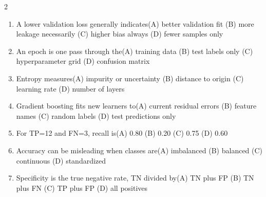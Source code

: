 \documentclass[a4paper]{article}
\begin{document}
\begin{multicols*}{2}
\begin{enumerate}[resume]
\item A lower validation loss generally indicates\newline\hspace*{0.6em}(A) better validation fit \quad (B) more leakage necessarily \newline\hspace*{0.6em}(C) higher bias always \quad (D) fewer samples only
\item An epoch is one pass through the\newline\hspace*{0.6em}(A) training data \quad (B) test labels only \newline\hspace*{0.6em}(C) hyperparameter grid \quad (D) confusion matrix
\item Entropy measures\newline\hspace*{0.6em}(A) impurity or uncertainty \quad (B) distance to origin \newline\hspace*{0.6em}(C) learning rate \quad (D) number of layers
\item Gradient boosting fits new learners to\newline\hspace*{0.6em}(A) current residual errors \quad (B) feature names \newline\hspace*{0.6em}(C) random labels \quad (D) test predictions only
\item For TP=12 and FN=3, recall is\newline\hspace*{0.6em}(A) 0.80 \quad (B) 0.20 \newline\hspace*{0.6em}(C) 0.75 \quad (D) 0.60
\item Accuracy can be misleading when classes are\newline\hspace*{0.6em}(A) imbalanced \quad (B) balanced \newline\hspace*{0.6em}(C) continuous \quad (D) standardized
\item Specificity is the true negative rate, TN divided by\newline\hspace*{0.6em}(A) TN plus FP \quad (B) TN plus FN \newline\hspace*{0.6em}(C) TP plus FP \quad (D) all positives

\end{enumerate}
\end{multicols*}
\end{document}
